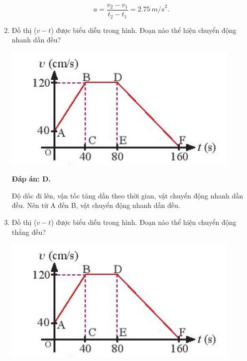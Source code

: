 \begin{enumerate}[label=\bfseries Câu \arabic*:]
{		$$a = \dfrac{v_2-v_1}{t_2 - t_1} = \SI{2,75}{m/s}^2.$$
		
		
	}
	\item {}
	
	
	{Đồ thị ($v - t$) được biểu diễn trong hình. Đoạn nào thể hiện chuyển động nhanh dần đều?
		\begin{center}
			\includegraphics[scale=0.6]{../figs/VN10-2022-PH-TP0001-6.jpg}
		\end{center}	
		
	}
	
	\hideall
	{\textbf{Đáp án: D.}
		
		Độ dốc đi lên, vận tốc tăng dần theo thời gian, vật chuyển động nhanh dần đều. Nên từ A đến B, vật chuyển động nhanh dần đều.
		
		
	
		
	}
		\item {}
	
	
	{Đồ thị ($v - t$) được biểu diễn trong hình. Đoạn nào thể hiện chuyển động thẳng đều?
		\begin{center}
			\includegraphics[scale=0.6]{../figs/VN10-2022-PH-TP0001-6.jpg}
		\end{center}	
		
}
\end{enumerate}

